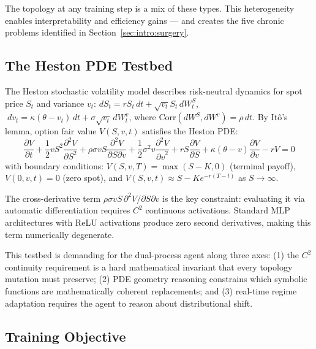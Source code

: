 \documentclass[11pt,a4paper]{article}
\begin{document}
The topology at any training step is a mix of these types. This heterogeneity enables
interpretability and efficiency gains --- and creates the five chronic problems
identified in Section~\ref{sec:intro:surgery}.

\subsection{The Heston PDE Testbed}
\label{sec:background:heston}

The Heston stochastic volatility model \citep{heston1993closed} describes risk-neutral
dynamics for spot price $S_t$ and variance $v_t$:
$dS_t = r S_t \, dt + \sqrt{v_t} S_t \, dW_t^S$, $\;dv_t = \kappa(\theta - v_t) \, dt + \sigma \sqrt{v_t} \, dW_t^v$,
where $\text{Corr}(dW^S, dW^v) = \rho \, dt$. By It\^o's lemma, option fair value
$V(S,v,t)$ satisfies the Heston PDE:
\begin{equation}
\frac{\partial V}{\partial t}
+ \frac{1}{2}vS^2\frac{\partial^2 V}{\partial S^2}
+ \rho\sigma vS\frac{\partial^2 V}{\partial S\partial v}
+ \frac{1}{2}\sigma^2 v\frac{\partial^2 V}{{\partial v}^2}
+ rS\frac{\partial V}{\partial S}
+ \kappa(\theta-v)\frac{\partial V}{\partial v}
- rV = 0
\label{eq:heston_pde}
\end{equation}
with boundary conditions:
$V(S, v, T) = \max(S - K, 0)$ (terminal payoff),
$V(0, v, t) = 0$ (zero spot), and
$V(S, v, t) \approx S - Ke^{-r(T-t)}$ as $S \to \infty$.

The cross-derivative term $\rho\sigma vS \,\partial^2 V / \partial S \partial v$ is
the key constraint: evaluating it via automatic differentiation requires $C^2$
continuous activations. Standard MLP architectures with ReLU activations produce
zero second derivatives, making this term numerically degenerate.

This testbed is demanding for the dual-process agent along three axes: (1) the $C^2$
continuity requirement is a hard mathematical invariant that every topology mutation
must preserve; (2) PDE geometry reasoning constrains which symbolic functions are
mathematically coherent replacements; and (3) real-time regime adaptation requires
the agent to reason about distributional shift.

\subsection{Training Objective}
\label{sec:background:loss}
\end{document}
